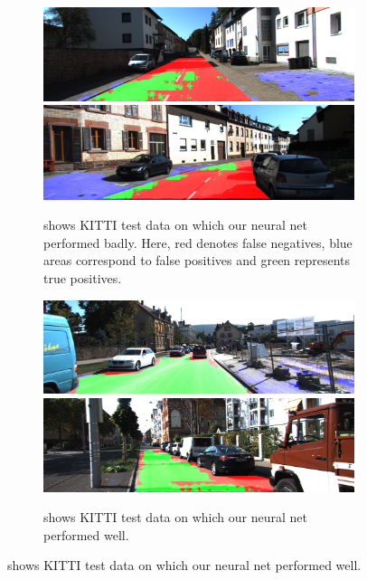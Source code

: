   \begin{figure}[]
  	\begin{subfigure}[t]{\columnwidth}

  		\includegraphics[width=\columnwidth]{figures/kitty_eval/Persp_um_road_000077.png}
  		\includegraphics[width=\columnwidth]{figures/kitty_eval/Persp_um_road_000095.png}
  		\caption{shows KITTI test data on which our neural net performed badly. Here, red denotes false negatives, blue areas correspond to false positives and green represents true positives.}
  		\label{fig:sfig1}
  	\end{subfigure}
  	\begin{subfigure}[t]{\columnwidth}
  		\includegraphics[width=\columnwidth]{figures/kitty_eval/Persp_uu_road_000027.png}
  		\includegraphics[width=\columnwidth]{figures/kitty_eval/Persp_uu_road_000082.png}
  		\caption{shows KITTI test data on which our neural net performed well.}
  		\label{fig:sfig2}
  	\end{subfigure}
  \end{figure}





